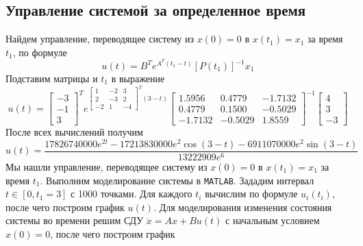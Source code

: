 \documentclass[a4paper, 12pt]{article}
\begin{document}
    \subsection{Управление системой за определенное время}
    Найдем управление, переводящее систему из $x(0)=0$ в $x(t_1)=x_1$ за время $t_1$, по формуле
    $$u(t)=B^Te^{A^T(t_1-t)}\left[P(t_1)\right]^{-1}x_1$$
    Подставим матрицы и $t_1$ в выражение
    $$u(t)=\begin{bmatrix}
        -3\\
        -1\\
        3
    \end{bmatrix}^T
    e^{\begin{bmatrix}
        1 &-2 &3\\
        2 &-3 &2\\
        -2 &1 &-4
    \end{bmatrix}^T\left(3-t\right)}\begin{bmatrix}
        1.5956    &0.4779   &-1.7132\\
        0.4779    &0.1500   &-0.5029\\
       -1.7132   &-0.5029    &1.8559
    \end{bmatrix}^{-1}\begin{bmatrix}
        4\\
        3\\
        -3
    \end{bmatrix}$$
    После всех вычислений получим
    $$
    u(t)=\dfrac{17826740000e^{2t}-17213830000e^2\cos{(3-t)}-6911070000e^2\sin{(3-t)}}{13222909e^6}    
    $$
    Мы нашли управление, переводящее систему из $x(0)=0$ в $x(t_1)=x_1$ за время $t_1$. Выполним моделирование системы
    в \texttt{MATLAB}. Зададим интервал $t\in\left[0,t_1=3\right]$ с 1000 точками.
    Для каждого $t_i$ вычислим по формуле $u_i(t_i)$, после чего построим график $u(t)$. Для моделирования изменения состояния
    системы во времени решим СДУ $\dot{x}=Ax+Bu(t)$ с начальным условием $x(0)=0$, после чего построим график
\end{document}
